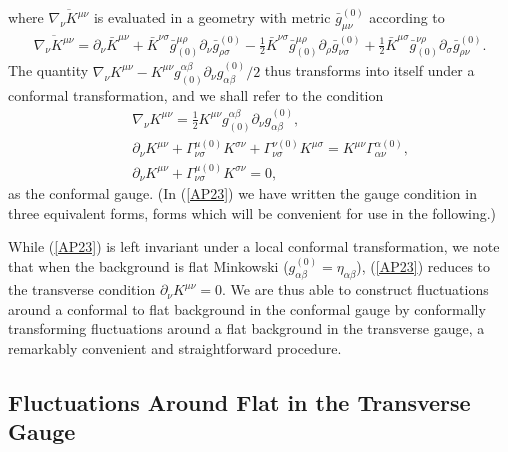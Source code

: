 \documentclass[aps]{revtex4}
\begin{document}
% 
where $\overline{\nabla_{\nu}K^{\mu\nu}}$ is evaluated in a geometry with metric $\bar{g}^{(0)}_{\mu\nu}$ according to 
%
\begin{eqnarray}
\overline{\nabla_{\nu}K^{\mu\nu}}=
\partial_{\nu}\bar{K}^{\mu\nu}
+\bar{K}^{\nu\sigma}\bar{g}_{(0)}^{\mu\rho}\partial_{\nu}\bar{g}^{(0)}_{\rho\sigma}
-\frac{1}{2}\bar{K}^{\nu\sigma}\bar{g}_{(0)}^{\mu\rho}\partial_{\rho}\bar{g}^{(0)}_{\nu\sigma}
+\frac{1}{2}\bar{K}^{\mu\sigma}\bar{g}_{(0)}^{\nu\rho}\partial_{\sigma}\bar{g}^{(0)}_{\rho\nu}.
\label{AP22}
\end{eqnarray}
% 
The quantity $\nabla_{\nu}K^{\mu\nu}- K^{\mu\nu}g_{(0)}^{\alpha\beta}\partial_{\nu}g^{(0)}_{\alpha\beta}/2$ thus transforms into itself under a conformal transformation, and we shall refer to the condition
%
\begin{eqnarray}
&&\nabla_{\nu}K^{\mu\nu}=\frac{1}{2}K^{\mu\nu}g_{(0)}^{\alpha\beta}\partial_{\nu}g^{(0)}_{\alpha\beta},
\nonumber\\
&&\partial_{\nu}K^{\mu\nu}+\Gamma^{\mu(0)}_{\nu\sigma}K^{\sigma\nu}
+\Gamma^{\nu(0)}_{\nu\sigma}K^{\mu\sigma}=K^{\mu\nu}\Gamma^{\alpha(0)}_{\alpha\nu},
\nonumber\\
&&\partial_{\nu}K^{\mu\nu}+\Gamma^{\mu(0)}_{\nu\sigma}K^{\sigma\nu}=0,
\label{AP23}
\end{eqnarray}
%
as the conformal gauge. (In (\ref{AP23}) we have written the gauge condition in three equivalent forms, forms which will be convenient for use in the following.) 

While (\ref{AP23}) is left invariant under a local conformal transformation, we note that when the background is flat Minkowski ($g^{(0)}_{\alpha\beta}=\eta_{\alpha\beta}$), (\ref{AP23}) reduces to the transverse condition $\partial_{\nu}K^{\mu\nu}=0$. We are thus able to construct fluctuations around a conformal to flat background in the conformal gauge by conformally transforming fluctuations around a flat background in the transverse gauge, a remarkably convenient and straightforward procedure.


\subsection{Fluctuations Around Flat in the Transverse Gauge}
\end{document}
